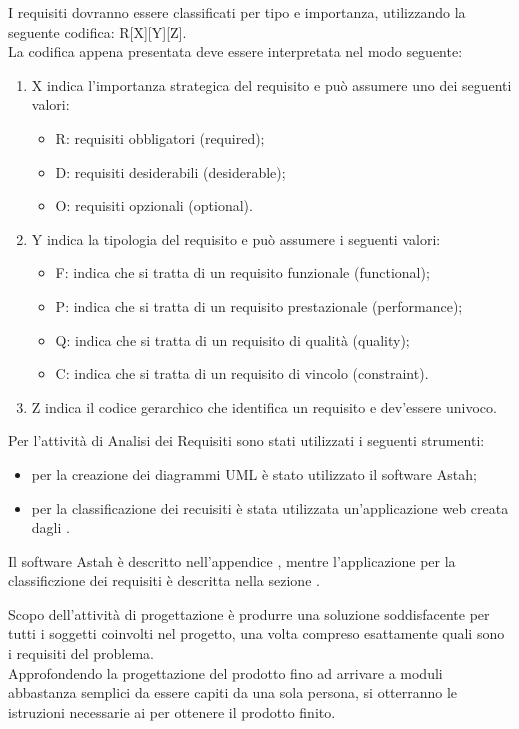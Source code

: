 					I requisiti dovranno essere classificati per tipo e importanza, utilizzando la seguente codifica: R[X][Y][Z].\\
					La codifica appena presentata deve essere interpretata nel modo seguente:
					\begin{enumerate}
						\item X indica l'importanza strategica del requisito e può assumere uno dei seguenti valori:
						\begin{itemize}
							\item R: requisiti obbligatori (required);
							\item D: requisiti desiderabili (desiderable);
							\item O: requisiti opzionali (optional).
						\end{itemize}
						\item Y indica la tipologia del requisito e può assumere i seguenti valori:
						\begin{itemize}
							\item F: indica che si tratta di un requisito funzionale (functional);
							\item P: indica che si tratta di un requisito prestazionale (performance);
							\item Q: indica che si tratta di un requisito di qualità (quality);
							\item C: indica che si tratta di un requisito di vincolo (constraint).
						\end{itemize}
						\item Z indica il codice gerarchico che identifica un requisito e dev'essere univoco.
					\end{enumerate}
			Per l'attività di Analisi dei Requisiti sono stati utilizzati i seguenti strumenti:
			\begin{itemize}
				\item per la creazione dei diagrammi UML è stato utilizzato il software Astah;
				\item per la classificazione dei recuisiti è stata utilizzata un'applicazione web creata dagli .
			\end{itemize}
			Il software Astah è descritto nell'appendice , mentre l'applicazione per la classificzione dei requisiti è descritta nella sezione .
			
Scopo dell'attività di progettazione è produrre una soluzione soddisfacente per tutti i soggetti coinvolti nel progetto, una volta compreso esattamente quali sono i requisiti del problema. \\
Approfondendo la progettazione del prodotto fino ad arrivare a moduli abbastanza semplici da essere capiti da una sola persona, si otterranno le istruzioni necessarie ai  per ottenere il prodotto finito.
			
